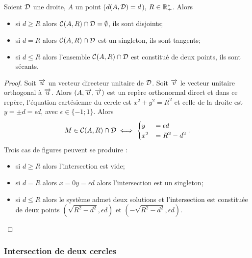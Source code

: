 \begin{prop}
    Soient \(\mathcal{D}\) une droite, \(A\) un point (\(d(A , \mathcal{D}) = d\)), \(R \in 
    \mathbb{R}_{+}^{*}\). Alors
    \begin{itemize}
        \item si \(d \geqslant R\) alors \(\mathcal{C}(A,R) \cap \mathcal{D} = \emptyset\), 
            ils sont disjoints;
        \item si \(d = R\) alors \(\mathcal{C}(A,R) \cap \mathcal{D}\) est un singleton, 
            ils sont tangents;
        \item si \(d\leqslant R\) alors l'ensemble \(\mathcal{C}(A,R) \cap \mathcal{D}\) 
            est constitué de deux points, ils sont sécants.
    \end{itemize}
\end{prop}

\begin{proof}
    Soit \(\overrightarrow{u}\) un vecteur directeur unitaire de \(\mathcal{D}\). Soit \(\overrightarrow{v}\) le 
    vecteur unitaire orthogonal à \(\overrightarrow{u}\). Alors \((A , \overrightarrow{u} , \overrightarrow{v})\) est un repère 
    orthonormal direct et dans ce repère, l'équation cartésienne du cercle est 
    \(x^2 + y^2 = R^2\) et celle de la droite est \(y = \pm d = \epsilon d\), 
    avec \(\epsilon \in \{-1; 1\}\). Alors 
    \begin{equation}
        M \in \mathcal{C}(A,R) \cap \mathcal{D} \iff  
        \begin{cases} 
            y& = \epsilon d \\ 
            x^2& = R^2 - d^2
        \end{cases}.
    \end{equation}
    Trois cas de figures peuvent se produire :
    \begin{itemize}
        \item si \(d \geqslant R\) alors l'intersection est vide;
        \item si \(d = R\) alors \(x = 0 y = \epsilon d\) alors l'intersection 
            est un singleton;
        \item si \(d \leqslant R\) alors le système admet deux solutions et 
            l'intersection est constituée de deux points 
            \((\sqrt{R^2 - d^2},\epsilon d)\) et \((-\sqrt{R^2 - d^2},\epsilon d)\).
    \end{itemize}
\end{proof}

\subsubsection{Intersection de deux cercles}

